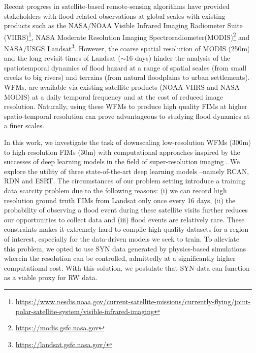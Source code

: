 Recent progress in satellite-based remote-sensing algorithms have provided stakeholders with flood related observations at global scales with existing products such as the NASA/NOAA Visible Infrared Imaging Radiometer Suite (VIIRS)\footnote{\href{https://www.nesdis.noaa.gov/current-satellite-missions/currently-flying/joint-polar-satellite-system/visible-infrared-imaging}{https://www.nesdis.noaa.gov/current-satellite-missions/currently-flying/joint-polar-satellite-system/visible-infrared-imaging}}, NASA Moderate Resolution Imaging Spectroradiometer(MODIS)\footnote{\url{https://modis.gsfc.nasa.gov}} and NASA/USGS Landsat\footnote{\href{https://landsat.gsfc.nasa.gov/}{https://landsat.gsfc.nasa.gov/}}. However, the coarse spatial resolution of MODIS (250m) and the long revisit times of  Landsat ($\sim$16 days) hinder the analysis of the spatiotemporal dynamics of flood hazard at a range of spatial scales (from small creeks to big rivers) and terrains (from natural floodplains to urban settlements). \acp{WFM}, are available via existing satellite products (NOAA VIIRS and NASA MODIS) at a daily temporal frequency and at the cost of reduced image resolution. Naturally, using these \acp{WFM} to produce high quality \acp{FIM} at higher spatio-temporal resolution can prove advantageous to studying flood dynamics at a finer scales.


In this work, we investigate the task of downscaling low-resolution \acp{WFM} (300m) to high-resolution \acp{FIM} (30m) with computational approaches inspired by the successes of deep learning models in the field of super-resolution imaging \cite{Wang2021DeepSurvey}. We explore the utility of three state-of-the-art deep learning models --namely \ac{RCAN}, \ac{RDN} and \ac{ESRT}. The circumstances of our problem setting introduce a training data scarcity problem due to the following reasons: (i) we can record high resolution ground truth \acp{FIM} from Landsat only once every 16 days, (ii) the probability of observing a flood event during these satellite visits further reduces our opportunities to collect data and (iii) flood events are relatively rare. These constraints makes it extremely hard to compile high quality datasets for a region of interest, especially for the data-driven models we seek to train. To alleviate this problem, we opted to use \ac{SYN} data generated by physics-based simulations wherein the resolution can be controlled, admittedly at a significantly higher computational cost. With this solution, we postulate that \ac{SYN} data can function as a viable proxy for \ac{RW} data.

